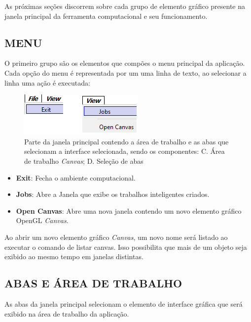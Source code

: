 As próximas seções discorrem sobre cada grupo de elemento gráfico presente na janela principal da ferramenta computacional e seu funcionamento.

\subsection{MENU}\label{sec:menu}

O primeiro grupo são os elementos que compões o menu principal da aplicação. Cada opção do menu é representada por um uma linha de texto, ao selecionar a linha uma ação é executada:

\begin{figure}[!htbp]
	\centering
	\includegraphics[scale=1]{Figures/IGU_016.png}
	\caption{Parte da janela principal contendo a área de trabalho e as abas que selecionam a interface selecionada, sendo os componentes: C. Área de trabalho \textit{Canvas}; D. Seleção de abas}
	\label{fig:menu}
\end{figure}


\begin{itemize}
	\item \textbf{Exit}: Fecha o ambiente computacional.
	\item \textbf{Jobs}: Abre a Janela que exibe os trabalhos inteligentes criados.
	\item \textbf{Open Canvas}: Abre uma nova janela contendo um novo elemento gráfico OpenGL \textit{Canvas}.
\end{itemize}

Ao abrir um novo elemento gráfico \textit{Canvas}, um novo nome será listado ao executar o comando de listar canvas. Isso possibilita que mais de um objeto seja exibido ao mesmo tempo em janelas distintas.

\subsection{ABAS E ÁREA DE TRABALHO}\label{sec:abas}

As abas da janela principal selecionam o elemento de interface gráfica que será exibido na área de trabalho da aplicação.

